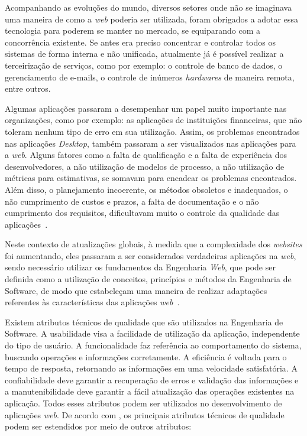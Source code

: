 Acompanhando as evoluções do mundo, diversos setores onde não se imaginava uma maneira de como a \textit{web} poderia ser utilizada, foram obrigados a adotar essa tecnologia para poderem se manter no mercado, se equiparando com a concorrência existente. Se antes era preciso concentrar e controlar todos os sistemas de forma interna e não unificada, atualmente já é possível realizar a terceirização de serviços, como por exemplo: o controle de banco de dados, o gerenciamento de e-mails, o controle de inúmeros \textit{hardwares} de maneira remota, entre outros.

Algumas aplicações passaram a desempenhar um papel muito importante nas organizações, como por exemplo: as aplicações de instituições financeiras, que não toleram nenhum tipo de erro em sua utilização. Assim, os problemas encontrados nas aplicações \textit{Desktop}, também passaram a ser visualizados nas aplicações para a \textit{web}. Alguns fatores como a falta de qualificação e a falta de experiência dos desenvolvedores, a não utilização de modelos de processo, a não utilização de métricas para estimativas, se somavam para encadear os problemas encontrados. Além disso, o planejamento incoerente, os métodos obsoletos e inadequados, o não cumprimento de custos e prazos, a falta de documentação e o não cumprimento dos requisitos, dificultavam muito o controle da qualidade das aplicações~\cite{peruch-pg07}.               

Neste contexto de atualizações globais, à medida que a complexidade dos \textit{websites} foi aumentando, eles passaram a ser considerados verdadeiras aplicações na \textit{web}, sendo necessário utilizar os fundamentos da Engenharia \textit{Web}, que pode ser definida como a utilização de conceitos, princípios e métodos da Engenharia de Software, de modo que estabeleçam uma maneira de realizar adaptações referentes às características das aplicações \textit{web}~\cite{beder:ew12}.

Existem atributos técnicos de qualidade que são utilizados na Engenharia de Software. A usabilidade visa a facilidade de utilização da aplicação, independente do tipo de usuário. A funcionalidade faz referência ao comportamento do sistema, buscando operações e informações corretamente. A eficiência é voltada para o tempo de resposta, retornando as informações em uma velocidade satisfatória. A confiabilidade deve garantir a recuperação de erros e validação das informações e a manutenibilidade deve garantir a fácil atualização das operações existentes na aplicação. Todos esses atributos podem ser utilizados no desenvolvimento de aplicações \textit{web}. De acordo com , os principais atributos técnicos de qualidade podem ser estendidos por meio de outros atributos: 

